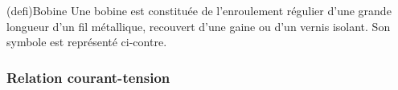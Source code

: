 \documentclass[../../main/main.tex]{subfiles}
\begin{document}
\begin{tcb}[label=def:bobine, sidebyside, righthand ratio=.3](defi){Bobine}
	Une bobine est constituée de l'enroulement régulier d'une grande
	longueur d'un fil métallique, recouvert d'une gaine ou d'un vernis
	isolant. Son symbole est représenté ci-contre.
	\tcblower
	\begin{center}
	\end{center}
\end{tcb}

\subsubsection{Relation courant-tension}
\end{document}
